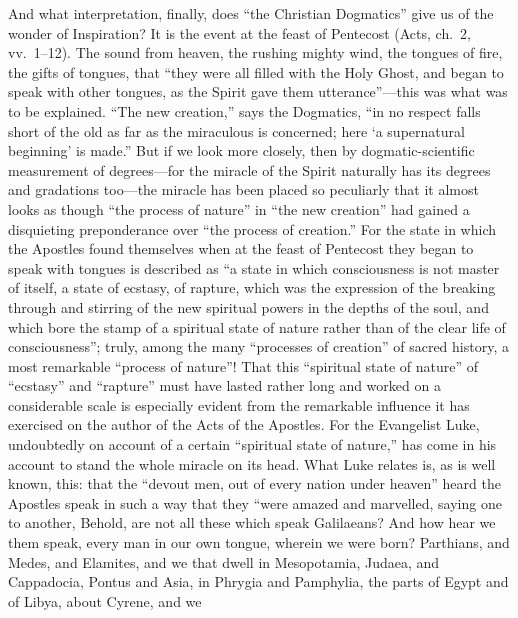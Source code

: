 \documentclass[12pt,a4paper]{article}
\newcommand{\opage}[1]{\marginnote{\footnotesize\textit{[#1]}}}
\begin{document}
And what interpretation, finally, does ``the Christian Dogmatics''
give us of the wonder of Inspiration? It is the event at the feast
of Pentecost (Acts, ch.~2, vv.~1--12). The sound from heaven, the
rushing mighty wind, the tongues of fire, the gifts of tongues, that
``they were all filled with the Holy Ghost, and began to speak with
other tongues, as the Spirit gave them utterance''---this was what
was to be explained. ``The new creation,'' says the Dogmatics,
``in no respect falls short of the old as far as the miraculous is
concerned; here `a supernatural beginning' is made.''%
{} But if we look more closely, then by dogmatic-scientific
measurement of degrees---for the miracle of the Spirit naturally has
its degrees and gradations too---the miracle has been placed so
peculiarly that it almost looks as though ``the process of nature''
in ``the new creation'' had gained a disquieting preponderance over
``the process of creation.'' For the state in which the Apostles
found themselves when at the feast of Pentecost they began to speak
with tongues is described as ``a state in which consciousness is
not master of itself, a state of ecstasy, of rapture, which was the
expression of the breaking through and stirring of the new spiritual
powers in the depths of the soul, and which bore the stamp of a
spiritual state of nature rather than of the clear life of
consciousness''; truly, among the many ``processes of creation'' of
sacred history, a most remarkable ``process of nature''! That this
``spiritual state of nature'' of ``ecstasy'' and ``rapture'' must
have lasted rather long and worked on a considerable scale is
especially evident from the remarkable influence it has exercised on
the author of the Acts of the Apostles. For the Evangelist Luke,
undoubtedly on account of a certain ``spiritual state of nature,''
has come in his account to stand the whole miracle on its head. What
Luke relates is, as is well known, this: that the ``devout men, out
of every nation under heaven'' heard the Apostles speak in such a
way that they ``were amazed and marvelled, saying one to another,
Behold, are not all these which speak Galilaeans? And how
\opage{10}%
hear we them speak, every man in our own tongue, wherein we were
born? Parthians, and Medes, and Elamites, and we that dwell in
Mesopotamia, Judaea, and Cappadocia, Pontus and Asia, in Phrygia and
Pamphylia, the parts of Egypt and of Libya, about Cyrene, and we
\end{document}

